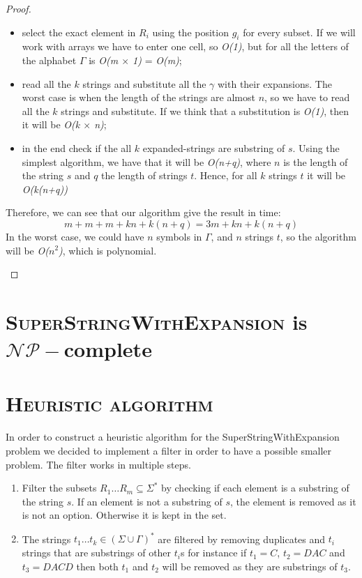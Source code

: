 \documentclass[paper=a4, fontsize=11pt]{scrartcl}
\numberwithin{equation}{section}		%
\numberwithin{figure}{section}			%
\numberwithin{table}{section}				%
\begin{document}
\begin{proof}
\begin{enumerate}
\begin{itemize}
	        	\item select the exact element in $R_i$ using the position $g_i$ for every subset. If we will work with arrays we have to enter one cell, so \textit{O(1)}, but for all the letters of the alphabet $\Gamma$ is \textit{O(m $\times$ 1)} = \textit{O(m)};
	        	\item read all the $k$ strings and substitute all the $\gamma$ with their expansions. The worst case is when the length of the strings are almost $n$, so we have to read all the $k$ strings and substitute. If we think that a substitution is \textit{O(1)}, then it will be \textit{O(k $\times$ n)};
	        	\item in the end check if the all $k$ expanded-strings are substring of $s$. Using the simplest algorithm, we have that it will be \textit{O(n+q)}, where $n$ is the length of the string $s$ and $q$ the length of strings $t$. Hence, for all $k$ strings $t$ it will be \textit{O(k(n+q))}
	        \end{itemize}
        Therefore, we can see that our algorithm give the result in time:
        $$m+m+m+kn+k(n+q) = 3m+kn+k(n+q) $$
        In the worst case, we could have $n$ symbols in $\mathcal{\Gamma}$, and $n$ strings $t$, so the algorithm will be \textit{O($n^2$)}, which is polynomial.          
\end{enumerate}
\end{proof}

\section{\textsc{SuperStringWithExpansion} is $\mathcal{NP}-$complete}
\section{\textsc{Heuristic algorithm}}
In order to construct a heuristic algorithm for the SuperStringWithExpansion problem we decided to implement a filter in order to have a possible smaller problem.
The filter works in multiple steps.
\begin{enumerate} 
\item
Filter the subsets $R_1\ldots R_m \subseteq \Sigma^*$ by checking if each element is a substring of the string $s$. If an element is not a substring of $s$, the element is removed as it is not an option. Otherwise it is kept in the set.
\item
The strings $t_1\ldots t_k \in (\Sigma \cup \Gamma)^*$ are filtered by removing duplicates and $t_i$ strings that are substrings of other $t_i$s for instance if $t_1=C$, $t_2=DAC$ and $t_3=DACD$ then both $t_1$ and $t_2$ will be removed as they are substrings of $t_3$.
\end{enumerate}

\end{document}
